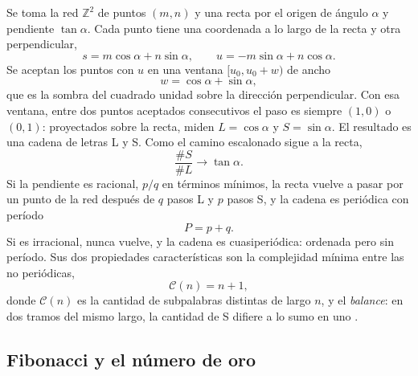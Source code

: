\documentclass[11pt,a4paper]{article}
\begin{document}
Se toma la red $\mathbb Z^2$ de puntos $(m, n)$ y una recta por el origen de ángulo $\alpha$ y pendiente $\tan\alpha$. Cada punto tiene una coordenada a lo largo de la recta y otra perpendicular,
\begin{equation}\label{eq:coordenadas}
s = m\cos\alpha + n\sin\alpha, \qquad u = -m\sin\alpha + n\cos\alpha .
\end{equation}
Se aceptan los puntos con $u$ en una ventana $[u_0, u_0 + w)$ de ancho
\begin{equation}\label{eq:ventana}
w = \cos\alpha + \sin\alpha ,
\end{equation}
que es la sombra del cuadrado unidad sobre la dirección perpendicular. Con esa ventana, entre dos puntos aceptados consecutivos el paso es siempre $(1, 0)$ o $(0, 1)$: proyectados sobre la recta, miden $L = \cos\alpha$ y $S = \sin\alpha$. El resultado es una cadena de letras L y S. Como el camino escalonado sigue a la recta,
\begin{equation}\label{eq:frecuencias}
\frac{\#S}{\#L} \to \tan\alpha .
\end{equation}
Si la pendiente es racional, $p/q$ en términos mínimos, la recta vuelve a pasar por un punto de la red después de $q$ pasos L y $p$ pasos S, y la cadena es periódica con período
\begin{equation}\label{eq:periodo}
P = p + q .
\end{equation}
Si es irracional, nunca vuelve, y la cadena es cuasiperiódica: ordenada pero sin período. Sus dos propiedades características son la complejidad mínima entre las no periódicas,
\begin{equation}\label{eq:complejidad}
\mathcal C(n) = n + 1 ,
\end{equation}
donde $\mathcal C(n)$ es la cantidad de subpalabras distintas de largo $n$, y el \emph{balance}: en dos tramos del mismo largo, la cantidad de S difiere a lo sumo en uno \parencite{morse1940,lothaire2002}.

\subsection{Fibonacci y el número de oro}
\end{document}
